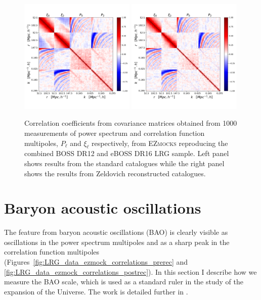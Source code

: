 \begin{figure}
    \centering 
    \includegraphics[width=0.49\textwidth]{fig/galaxies/covariance_prerecon.pdf}
    \includegraphics[width=0.49\textwidth]{fig/galaxies/covariance.pdf}
    \caption{Correlation coefficients from covariance matrices obtained from 1000 measurements
    of power spectrum and correlation function multipoles, $P_\ell$ and $\xi_\ell$ respectively,
    from \textsc{EZmocks} reproducing the combined BOSS DR12 and eBOSS DR16 LRG sample.
    Left panel shows results from the standard catalogues while the right panel 
    shows the results from Zeldovich reconstructed catalogues. 
    }
    \label{fig:covariance_ezmock}
\end{figure}


\section{Baryon acoustic oscillations}
\label{galaxies:bao}

The feature from baryon acoustic oscillations (BAO) is clearly visible 
as oscillations in the power spectrum multipoles and as a sharp peak 
in the correlation function multipoles 
(Figures~\ref{fig:LRG_data_ezmock_correlations_prerec} and 
\ref{fig:LRG_data_ezmock_correlations_postrec}). 
In this section I describe how we measure the BAO scale, which 
is used as a standard ruler in the study of the expansion of the Universe. 
The work is detailed further in 
\cite{bautistaCompletedSDSSIVExtended2020,
gil-marinCompletedSDSSIVExtended2020}.

